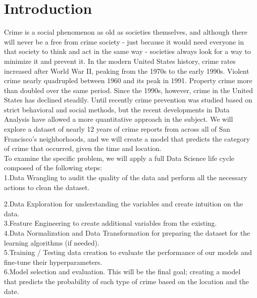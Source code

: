 \section{Introduction}
\label{sec-intro}

Crime is a social phenomenon as old as societies themselves, and although
 there will never be a free from crime society - just because it would need 
 everyone in that society to think and act in the same way - societies 
 always look for a way to minimize it and prevent it. In the modern United 
 States history, crime rates increased after World War II, peaking from 
 the 1970s to the early 1990s. Violent crime nearly quadrupled between 1960 
 and its peak in 1991. Property crime more than doubled over the same period. 
 Since the 1990s, however, crime in the United States has declined steadily. 
 Until recently crime prevention was studied based on strict behavioral
and social methods, but the recent developments in Data Analysis have 
allowed a more quantitative approach in the subject. We will explore a 
dataset of nearly 12 years of crime reports from across all of San Francisco's
neighborhoods, and we will create a model that predicts the category of crime
that occurred, given the time and location.\\

To examine the specific problem, we will apply a full Data Science life cycle composed of the following steps:\\

1.Data Wrangling to audit the quality of the data and perform all the necessary actions to clean the dataset.

2.Data Exploration for understanding the variables and create intuition on the data.\\

3.Feature Engineering to create additional variables from the existing.\\

4.Data Normalization and Data Transformation for preparing the dataset for the learning algorithms (if needed).\\

5.Training / Testing data creation to evaluate the performance of our models and fine-tune their hyperparameters.\\

6.Model selection and evaluation. This will be the final goal; creating a model that predicts the probability of each type of crime based on the location and the date.\\




















